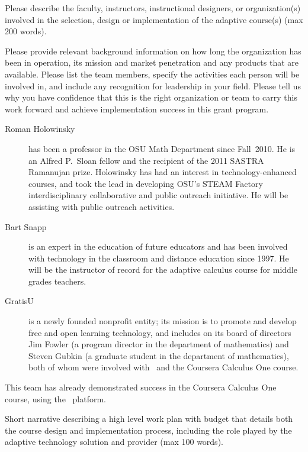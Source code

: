 \begin{question}
  Please describe the faculty, instructors, instructional designers,
  or organization(s) involved in the selection, design or
  implementation of the adaptive course(s) (max 200 words).

  Please provide relevant background information on how long the
  organization has been in operation, its mission and market
  penetration and any products that are available. Please list the
  team members, specify the activities each person will be involved
  in, and include any recognition for leadership in your field. Please
  tell us why you have confidence that this is the right organization
  or team to carry this work forward and achieve implementation
  success in this grant program.
\end{question}

\begin{description}
\item[Roman Holowinsky] has been a professor in the OSU Math
  Department since Fall~2010. He is an Alfred P.~Sloan fellow and the
  recipient of the 2011 SASTRA Ramanujan prize.  Holowinsky has had an
  interest in technology-enhanced courses, and took the lead in
  developing OSU's STEAM Factory interdisciplinary collaborative and
  public outreach initiative.  He will be assisting with public
  outreach activities.
\item[Bart Snapp] is an expert in the education of future educators
  and has been involved with technology in the classroom and distance
  education since 1997.  He will be the instructor of record for the
  adaptive calculus course for middle grades teachers.
\item[GratisU] is a newly founded nonprofit entity; its mission is to
  promote and develop free and open learning technology, and includes
  on its board of directors Jim Fowler (a program director in the
  department of mathematics) and Steven Gubkin (a graduate student in
  the department of mathematics), both of whom were involved with
  \mooculus\ and the Coursera Calculus One course.
\end{description}
This team has already demonstrated success in the Coursera Calculus
One course, using the \mooculus\ platform.

\begin{question}
Short narrative describing a high level work plan with budget
that details both the course design and implementation process,
including the role played by the adaptive technology solution and
provider (max 100 words).
\end{question}

